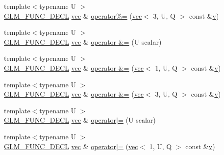 \begin{DoxyCompactItemize}
\item 
{\footnotesize template$<$typename U $>$ }\\\hyperlink{setup_8hpp_ab2d052de21a70539923e9bcbf6e83a51}{G\+L\+M\+\_\+\+F\+U\+N\+C\+\_\+\+D\+E\+CL} \hyperlink{structglm_1_1vec}{vec} \& \hyperlink{structglm_1_1vec_3_013_00_01_t_00_01_q_01_4_a60aee54fdff3fb07eb2a58f95c9690c5}{operator\%=} (\hyperlink{structglm_1_1vec}{vec}$<$ 3, U, Q $>$ const \&\hyperlink{_s_d_l__opengl_8h_a10a82eabcb59d2fcd74acee063775f90}{v})
\item 
{\footnotesize template$<$typename U $>$ }\\\hyperlink{setup_8hpp_ab2d052de21a70539923e9bcbf6e83a51}{G\+L\+M\+\_\+\+F\+U\+N\+C\+\_\+\+D\+E\+CL} \hyperlink{structglm_1_1vec}{vec} \& \hyperlink{structglm_1_1vec_3_013_00_01_t_00_01_q_01_4_a53ed94a1a8c5d6e72de59460b96ac122}{operator \&=} (U scalar)
\item 
{\footnotesize template$<$typename U $>$ }\\\hyperlink{setup_8hpp_ab2d052de21a70539923e9bcbf6e83a51}{G\+L\+M\+\_\+\+F\+U\+N\+C\+\_\+\+D\+E\+CL} \hyperlink{structglm_1_1vec}{vec} \& \hyperlink{structglm_1_1vec_3_013_00_01_t_00_01_q_01_4_a4004b269d4ba52855467734b9acbad9f}{operator \&=} (\hyperlink{structglm_1_1vec}{vec}$<$ 1, U, Q $>$ const \&\hyperlink{_s_d_l__opengl_8h_a10a82eabcb59d2fcd74acee063775f90}{v})
\item 
{\footnotesize template$<$typename U $>$ }\\\hyperlink{setup_8hpp_ab2d052de21a70539923e9bcbf6e83a51}{G\+L\+M\+\_\+\+F\+U\+N\+C\+\_\+\+D\+E\+CL} \hyperlink{structglm_1_1vec}{vec} \& \hyperlink{structglm_1_1vec_3_013_00_01_t_00_01_q_01_4_ab9bb5a0a46b3788c7ddfef17b53bae95}{operator \&=} (\hyperlink{structglm_1_1vec}{vec}$<$ 3, U, Q $>$ const \&\hyperlink{_s_d_l__opengl_8h_a10a82eabcb59d2fcd74acee063775f90}{v})
\item 
{\footnotesize template$<$typename U $>$ }\\\hyperlink{setup_8hpp_ab2d052de21a70539923e9bcbf6e83a51}{G\+L\+M\+\_\+\+F\+U\+N\+C\+\_\+\+D\+E\+CL} \hyperlink{structglm_1_1vec}{vec} \& \hyperlink{structglm_1_1vec_3_013_00_01_t_00_01_q_01_4_a0e29cf6b424eea7861eabc0314b5503a}{operator$\vert$=} (U scalar)
\item 
{\footnotesize template$<$typename U $>$ }\\\hyperlink{setup_8hpp_ab2d052de21a70539923e9bcbf6e83a51}{G\+L\+M\+\_\+\+F\+U\+N\+C\+\_\+\+D\+E\+CL} \hyperlink{structglm_1_1vec}{vec} \& \hyperlink{structglm_1_1vec_3_013_00_01_t_00_01_q_01_4_af0bea30bfc8f2f2b752cb089670fc904}{operator$\vert$=} (\hyperlink{structglm_1_1vec}{vec}$<$ 1, U, Q $>$ const \&\hyperlink{_s_d_l__opengl_8h_a10a82eabcb59d2fcd74acee063775f90}{v})

\end{DoxyCompactItemize}
